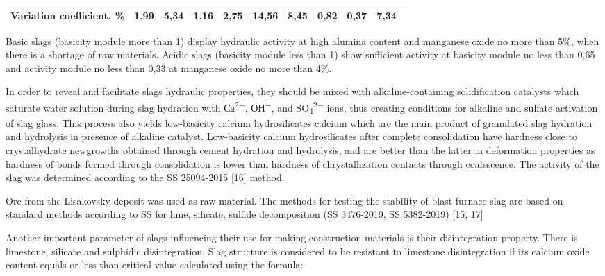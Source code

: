 \begin{table}[H]
{\begin{tabular}{|llllllllllp{}|}
\multicolumn{1}{|l|}{Variation coefficient, \%} & \multicolumn{1}{l|}{1,99} & \multicolumn{1}{l|}{5,34} & \multicolumn{1}{l|}{1,16} & \multicolumn{1}{l|}{2,75} & \multicolumn{1}{l|}{14,56} & \multicolumn{1}{l|}{8,45} & \multicolumn{1}{l|}{0,82} & \multicolumn{1}{l|}{0,37} & \multicolumn{1}{l|}{7,34} &  \\ \hline
\end{tabular}
}
\end{table}

\begin{multicols}{2}
Basic slags (basicity module more than 1) display hydraulic activity at
high alumina content and manganese oxide no more than 5\%, when there is
a shortage of raw materials. Acidic slags (basicity module less than 1)
show sufficient activity at basicity module no less than 0,65 and
activity module no less than 0,33 at manganese oxide no more than 4\%.

In order to reveal and facilitate slags\textquotesingle{} hydraulic
properties, they should be mixed with alkaline-containing solidification
catalysts which saturate water solution during slag hydration with
Са\textsuperscript{2+}, ОН\textsuperscript{−}, and
SO\textsubscript{4}\textsuperscript{2−} ions, thus creating conditions
for alkaline and sulfate activation of slag glass. This process also
yields low-basicity calcium hydrosilicates calcium which are the main
product of granulated slag hydration and hydrolysis in presence of
alkaline catalyst. Low-basicity calcium hydrosilicates after complete
consolidation have hardness close to crystalhydrate newgrowths obtained
through cement hydration and hydrolysis, and are better than the latter
in deformation properties as hardness of bonds formed through
consolidation is lower than hardness of chrystallization contacts
through coalescence. The activity of the slag was determined according
to the SS 25094-2015 {[}16{]} method.

Ore from the Lisakovsky deposit was used as raw material. The methods
for testing the stability of blast furnace slag are based on standard
methods according to SS for lime, silicate, sulfide decomposition (SS
3476-2019, SS 5382-2019) {[}15, 17{]}

Another important parameter of slags influencing their use for making
construction materials is their disintegration property. There is
limestone, silicate and sulphidic disintegration. Slag structure is
considered to be resistant to limestone disintegration if its calcium
oxide content equals or less than critical value calculated using the
formula:


\end{multicols}
